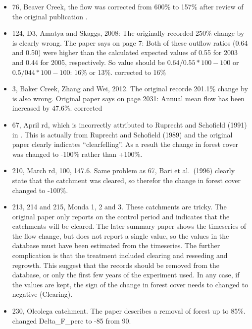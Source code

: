 \documentclass[]{elsarticle} %
\providecommand{\tightlist}{%
  \setlength{\itemsep}{0pt}\setlength{\parskip}{0pt}}
\begin{document}
\begin{itemize}
\tightlist
\item
  76, Beaver Creek, the flow was corrected from 600\% to 157\% after review of the original publication \citep{baker1984}.
\item
  124, D3, Amatya and Skaggs, 2008: The originally recorded 250\% change by \citet{zhang2017} is clearly wrong. The paper says on page 7: Both of these outflow ratios (0.64 and 0.50) were higher than the calculated expected values of 0.55 for 2003 and 0.44 for 2005, respectively. So value should be \(0.64/0.55*100 - 100\) or \(0.5/044*100 - 100\): 16\% or 13\%. corrected to 16\%
\item
  3, Baker Creek, Zhang and Wei, 2012. The original recorde 201.1\% change by \citet{zhang2017} is also wrong. Original paper says on page 2031: Annual mean flow has been increased by 47.6\%. corrected\\
\item
  67, April rd, which is incorrectly attributed to Ruprecht and Schofield (1991) in \citet{zhang2017}. This is actually from Ruprecht and Schofield (1989) and the original paper clearly indicates ``clearfelling''. As a result the change in forest cover was changed to -100\% rather than +100\%.\\
\item
  210, March rd, 100, 147.6. Same problem as 67, Bari et al.~(1996) clearly state that the catchment was cleared, so therefor the change in forest cover changed to -100\%.\\
\item
  213, 214 and 215, Monda 1, 2 and 3. These catchments are tricky. The original paper \citep{oshaughnessy1979} only reports on the control period and indicates that the catchments will be cleared. The later summary paper \citep{watson2001} shows the timeseries of the flow change, but does not report a single value, so the values in the database must have been estimated from the timeseries. The further complication is that the treatment included clearing and reseeding and regrowth. This suggest that the records should be removed from the database, or only the first few years of the experiment used. In any case, if the values are kept, the sign of the change in forest cover needs to changed to negative (Clearing).\\
\item
  230, Oleolega catchment. The paper describes a removal of forest up to 85\%. changed Delta\_F\_perc to -85 from 90.\\

\end{itemize}
\end{document}
